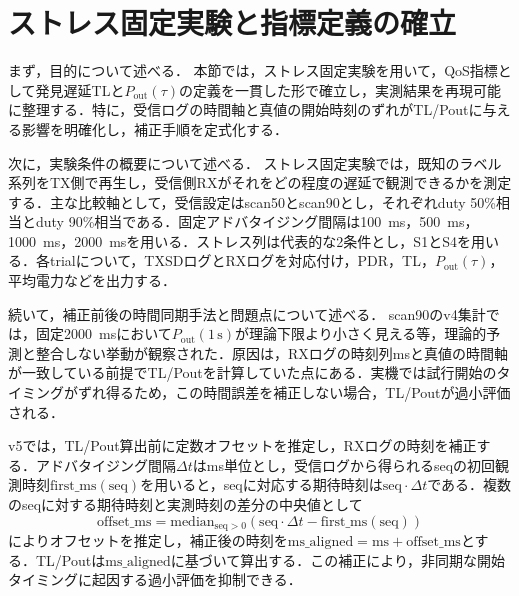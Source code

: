 \section{ストレス固定実験と指標定義の確立}
\label{sec:stress_fixed_metrics}

まず，目的について述べる．
本節では，ストレス固定実験を用いて，QoS指標として発見遅延TLと$P_{\mathrm{out}}(\tau)$の定義を一貫した形で確立し，実測結果を再現可能に整理する．特に，受信ログの時間軸と真値の開始時刻のずれがTL/Poutに与える影響を明確化し，補正手順を定式化する．

次に，実験条件の概要について述べる．
ストレス固定実験では，既知のラベル系列をTX側で再生し，受信側RXがそれをどの程度の遅延で観測できるかを測定する．主な比較軸として，受信設定はscan50とscan90とし，それぞれduty 50\%相当とduty 90\%相当である．固定アドバタイジング間隔は\SI{100}{\milli\second}，\SI{500}{\milli\second}，\SI{1000}{\milli\second}，\SI{2000}{\milli\second}を用いる．ストレス列は代表的な2条件とし，S1とS4を用いる．各trialについて，TXSDログとRXログを対応付け，PDR，TL，$P_{\mathrm{out}}(\tau)$，平均電力などを出力する．

続いて，補正前後の時間同期手法と問題点について述べる．
scan90のv4集計では，固定\SI{2000}{\milli\second}において$P_{\mathrm{out}}(1\,\mathrm{s})$が理論下限より小さく見える等，理論的予測と整合しない挙動が観察された．原因は，RXログの時刻列msと真値の時間軸が一致している前提でTL/Poutを計算していた点にある．実機では試行開始のタイミングがずれ得るため，この時間誤差を補正しない場合，TL/Poutが過小評価される．

v5では，TL/Pout算出前に定数オフセットを推定し，RXログの時刻を補正する．アドバタイジング間隔$\Delta t$はms単位とし，受信ログから得られるseqの初回観測時刻$\mathrm{first\_ms}(\mathrm{seq})$を用いると，seqに対応する期待時刻は$\mathrm{seq}\cdot\Delta t$である．複数のseqに対する期待時刻と実測時刻の差分の中央値として
\begin{equation}
  \mathrm{offset\_ms} = \mathrm{median}_{\mathrm{seq}>0}\left(\mathrm{seq}\cdot\Delta t - \mathrm{first\_ms}(\mathrm{seq})\right)
\end{equation}
によりオフセットを推定し，補正後の時刻を$\mathrm{ms\_aligned}=\mathrm{ms}+\mathrm{offset\_ms}$とする．TL/Poutは$\mathrm{ms\_aligned}$に基づいて算出する．この補正により，非同期な開始タイミングに起因する過小評価を抑制できる．

